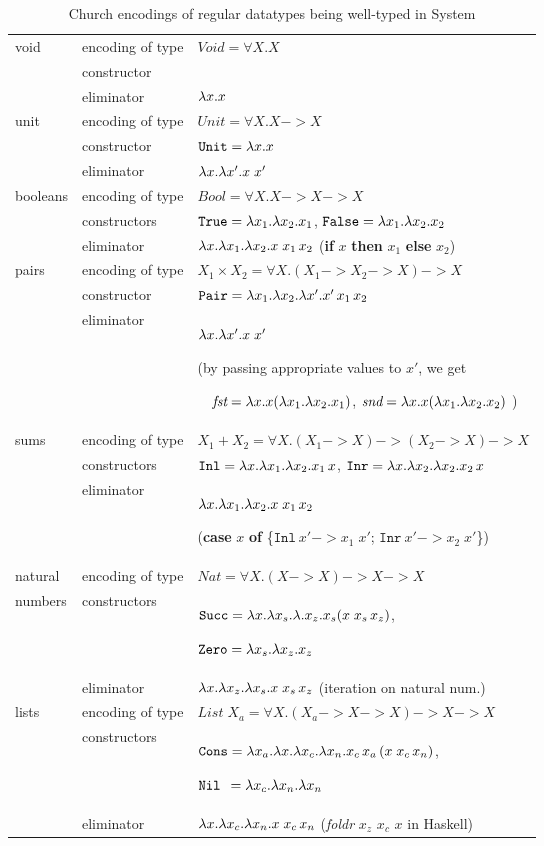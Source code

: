 \begin{table}
\begin{tabular}{p{15mm}|lp{92mm}}
	\hline
void
& encoding of type	& $\textit{Void} = \forall X.X$ \\
& constructor		& \\
& eliminator		& $\lambda x.x$
	\\\hline
unit
& encoding of type	& $\textit{Unit} = \forall X.X -> X$	\\
& constructor		& $\mathtt{Unit} = \lambda x.x$ \\
& eliminator		& $\lambda x.\lambda x'.x\;x'$
	\\\hline
booleans
& encoding of type	& $\textit{Bool} = \forall X.X -> X -> X$ \\
& constructors		& $\mathtt{True} = \lambda x_1.\lambda x_2. x_1$,\quad
			$\mathtt{False} = \lambda x_1.\lambda x_2. x_2$ \\
& eliminator		& $\lambda x.\lambda x_1. \lambda x_2. x\;x_1\,x_2$ \qquad
			(\textbf{if} $x$ \textbf{then} $x_1$ \textbf{else} $x_2$)
	\\\hline
pairs
& encoding of type	& $ X_1\times X_2 = \forall X. (X_1 -> X_2 -> X) -> X$ \\
& constructor		& $\mathtt{Pair} = \lambda x_1.\lambda x_2.\lambda x'.x'\,x_1\,x_2$ \\
& eliminator		& $\lambda x.\lambda x'.x\;x'$ \par
			(by passing appropriate values to $x'$, we get\par
			~~$\textit{fst} = \lambda x.x(\lambda x_1.\lambda x_2.x_1)$,
			$\textit{snd} = \lambda x.x(\lambda x_1.\lambda x_2.x_2)$ )
	\\\hline
sums
& encoding of type	& $X_1+X_2 = \forall X. (X_1 -> X) -> (X_2 -> X) -> X$ \\
& constructors		& $\mathtt{Inl} = \lambda x. \lambda x_1. \lambda x_2 . x_1\,x$,\quad
			$\mathtt{Inr} = \lambda x. \lambda x_2. \lambda x_2 . x_2\,x$ \\
& eliminator		& $\lambda x.\lambda x_1. \lambda x_2. x\;x_1\,x_2$ \par
			(\textbf{case} $x$ \textbf{of}
				\{$\mathtt{Inl}~x' -> x_1\;x'$;
				  $\mathtt{Inr}~x' -> x_2\;x'$\})
	\\\hline
natural
& encoding of type	& $\textit{Nat} = \forall X. (X -> X) -> X -> X$ \\
numbers
& constructors		& $\mathtt{Succ} = \lambda x. \lambda x_s. \lambda. x_z. x_s (x\;x_s\,x_z)$,\par
			$\mathtt{Zero} = \lambda x_s. \lambda x_z. x_z$ \\
& eliminator		& $\lambda x.\lambda x_z. \lambda x_s.x\;x_s\,x_z$ \quad
			(iteration on natural num.)
	\\\hline
lists
& encoding of type	& $\textit{List}\;X_a = \forall X. (X_a -> X -> X) -> X -> X$ \\
& constructors		& $\mathtt{Cons} = \lambda x_a.\lambda x.\lambda x_c.\lambda x_n. x_c\,x_a\,(x\;x_c\,x_n)$,\par
			$\mathtt{Nil}\;\, = \lambda x_c.\lambda x_n.\lambda x_n$ \\
& eliminator		& $\lambda x.\lambda x_c. \lambda x_n.x\;x_c\,x_n$ \quad
			(\textit{foldr} $x_z$ $x_c$ $x$ in Haskell)
	\\\hline
\end{tabular}
\caption{Church encodings of regular datatypes being well-typed in System \F}
\label{tbl:dataF}
\end{table}

